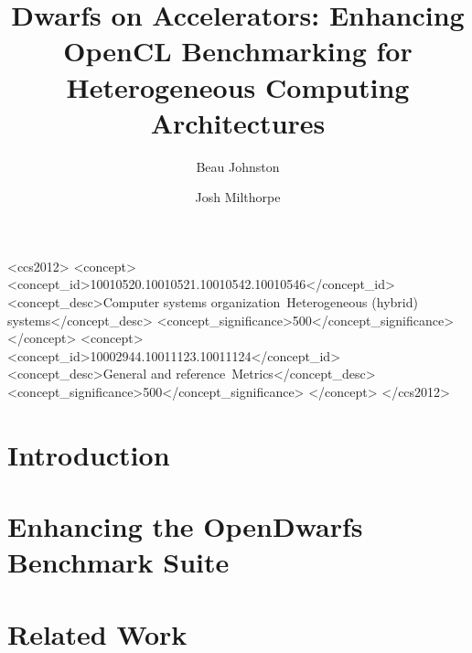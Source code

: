 \documentclass[sigconf,preprint,9pt]{acmart}
\begin{document}
\title[Dwarfs on Accelerators]{Dwarfs on Accelerators: Enhancing OpenCL Benchmarking for Heterogeneous Computing Architectures}

\author{Beau Johnston}

\author{Josh Milthorpe}

\begin{abstract}
	
\end{abstract}

\begin{CCSXML}
	<ccs2012>
	<concept>
	<concept_id>10010520.10010521.10010542.10010546</concept_id>
	<concept_desc>Computer systems organization~Heterogeneous (hybrid) systems</concept_desc>
	<concept_significance>500</concept_significance>
	</concept>
	<concept>
	<concept_id>10002944.10011123.10011124</concept_id>
	<concept_desc>General and reference~Metrics</concept_desc>
	<concept_significance>500</concept_significance>
	</concept>
	</ccs2012>
\end{CCSXML}

\maketitle

\section{Introduction}
\section{Enhancing the OpenDwarfs Benchmark Suite}

\section{Related Work}
\end{document}
